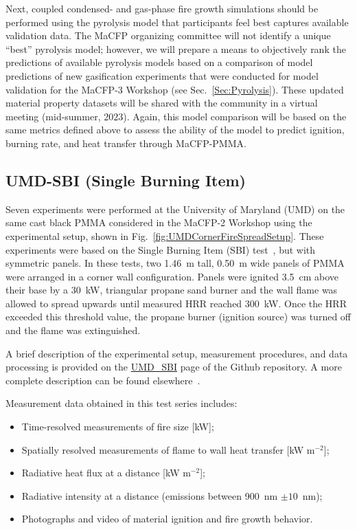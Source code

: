 \documentclass[12pt]{article}
\begin{document}
Next, coupled condensed- and gas-phase fire growth simulations should be performed using the pyrolysis model that participants feel best captures available validation data. The MaCFP organizing committee will not identify a unique ``best'' pyrolysis model; however, we will prepare a means to objectively rank the predictions of available pyrolysis models based on a comparison of model predictions of new gasification experiments that were conducted for model validation for the MaCFP-3 Workshop (see Sec.~\ref{Sec:Pyrolysis}). These updated material property datasets will be shared with the community in a virtual meeting (mid-summer, 2023). Again, this model comparison will be based on the same metrics defined above to assess the ability of the model to predict ignition, burning rate, and heat transfer through MaCFP-PMMA.

\subsection {UMD-SBI (Single Burning Item)}
Seven experiments were performed at the University of Maryland (UMD) on the same cast black PMMA considered in the MaCFP-2 Workshop using the experimental setup, shown in Fig.~\ref{fig:UMDCornerFireSpreadSetup}. These experiments were based on the Single Burning Item (SBI) test~\cite{EN-13823standard}, but with symmetric panels. In these tests, two 1.46~m tall, 0.50~m wide panels of PMMA were arranged in a corner wall configuration. Panels were ignited 3.5~cm above their base by a 30~kW, triangular propane sand burner and the wall flame was allowed to spread upwards until measured HRR reached 300~kW. Once the HRR exceeded this threshold value, the propane burner (ignition source) was turned off and the flame was extinguished.

A brief description of the experimental setup, measurement procedures, and data processing is provided on the \href{https://github.com/MaCFP/macfp-db/tree/master/Fire_Growth/UMD_SBI}{UMD\_SBI} page of the Github repository. A more complete description can be found elsewhere~\cite{chaudhari2021experimental}.

Measurement data obtained in this test series includes:
\begin{itemize}[noitemsep]
\item Time-resolved measurements of fire size [kW];
\item Spatially resolved measurements of flame to wall heat transfer [kW m$^{-2}$];
\item Radiative heat flux at a distance [kW m$^{-2}$];
\item Radiative intensity at a distance (emissions between 900~nm $\pm10$~nm);
\item Photographs and video of material ignition and fire growth behavior.
\end{itemize}
\end{document}

